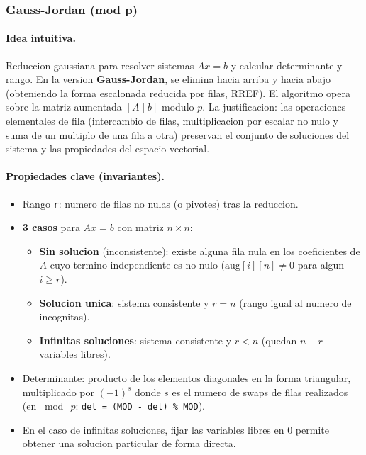 \subsubsection{Gauss-Jordan (mod p)}

\paragraph{Idea intuitiva.}
Reduccion gaussiana para resolver sistemas $Ax = b$ y calcular determinante y rango. En la version \textbf{Gauss-Jordan}, se elimina hacia arriba y hacia abajo (obteniendo la forma escalonada reducida por filas, RREF). El algoritmo opera sobre la matriz aumentada $[A \mid b]$ modulo $p$. La justificacion: las operaciones elementales de fila (intercambio de filas, multiplicacion por escalar no nulo y suma de un multiplo de una fila a otra) preservan el conjunto de soluciones del sistema y las propiedades del espacio vectorial.

\paragraph{Propiedades clave (invariantes).}
\begin{itemize}\setlength\itemsep{0pt}
	\item Rango \texttt{r}: numero de filas no nulas (o pivotes) tras la reduccion.
	\item \textbf{3 casos} para $Ax = b$ con matriz $n \times n$:
	\begin{itemize}\setlength\itemsep{0pt}
		\item \textbf{Sin solucion} (inconsistente): existe alguna fila nula en los coeficientes de $A$ cuyo termino independiente es no nulo ($\text{aug}[i][n] \ne 0$ para algun $i \ge r$).
		\item \textbf{Solucion unica}: sistema consistente y $r = n$ (rango igual al numero de incognitas).
		\item \textbf{Infinitas soluciones}: sistema consistente y $r < n$ (quedan $n - r$ variables libres).
	\end{itemize}
	\item Determinante: producto de los elementos diagonales en la forma triangular, multiplicado por $(-1)^s$ donde $s$ es el numero de swaps de filas realizados (en $\bmod\ p$: \texttt{det = (MOD - det) \% MOD}).
	\item En el caso de infinitas soluciones, fijar las variables libres en $0$ permite obtener una solucion particular de forma directa.
\end{itemize}

